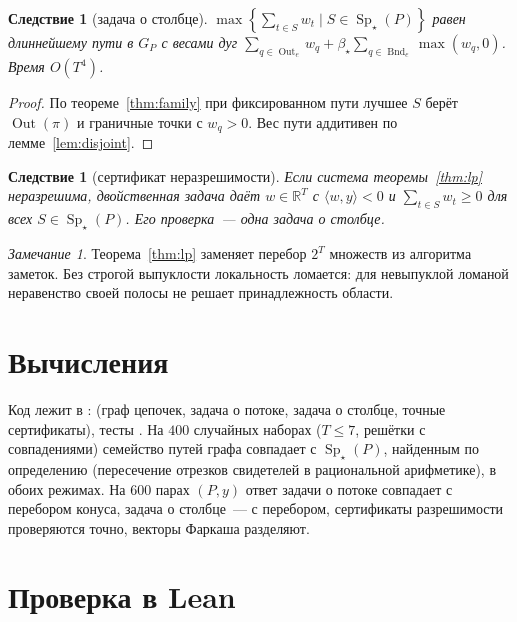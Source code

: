 \documentclass[a4paper,11pt]{article}
\theoremstyle{plain}
\newtheorem{corollary}[theorem]{Следствие}
\theoremstyle{definition}
\theoremstyle{remark}
\newtheorem*{remark}{Замечание}
\newcommand{\R}{\mathbb{R}}
\newcommand{\set}[1]{\left\{ #1 \right\}}
\newcommand{\ip}[2]{\langle #1, #2\rangle}
\DeclareMathOperator{\Sp}{Sp}
\DeclareMathOperator{\Out}{Out}
\DeclareMathOperator{\Bnd}{Bnd}
\newcommand{\Spm}{\Sp_\star}
\begin{document}
\begin{corollary}[задача о столбце]\label{cor:col}
    $\max\set{\sum_{t\in S}w_t\mid S\in\Spm(P)}$ равен длиннейшему пути в $G_P$ с весами дуг $\sum_{q\in\Out_e}w_q+\beta_\star\sum_{q\in\Bnd_e}\max(w_q,0)$. Время $O(T^4)$.
\end{corollary}

\begin{proof}
    По теореме~\ref{thm:family} при фиксированном пути лучшее $S$ берёт $\Out(\pi)$ и граничные точки с $w_q>0$. Вес пути аддитивен по лемме~\ref{lem:disjoint}.
\end{proof}

\begin{corollary}[сертификат неразрешимости]\label{cor:farkas}
    Если система теоремы~\ref{thm:lp} неразрешима, двойственная задача даёт $w\in\R^T$ с $\ip{w}{y}<0$ и $\sum_{t\in S}w_t\ge0$ для всех $S\in\Spm(P)$. Его проверка~--- одна задача о столбце.
\end{corollary}

\begin{remark}
    Теорема~\ref{thm:lp} заменяет перебор $2^T$ множеств из алгоритма заметок. Без строгой выпуклости локальность ломается: для невыпуклой ломаной неравенство своей полосы не решает принадлежность области.
\end{remark}

\section{Вычисления}\label{sec:exp}

Код лежит в :  (граф цепочек, задача о потоке, задача о столбце, точные сертификаты), тесты . На $400$ случайных наборах ($T\le7$, решётки с совпадениями) семейство путей графа совпадает с $\Spm(P)$, найденным по определению (пересечение отрезков свидетелей в рациональной арифметике), в обоих режимах. На $600$ парах $(P,y)$ ответ задачи о потоке совпадает с перебором конуса, задача о столбце~--- с перебором, сертификаты разрешимости проверяются точно, векторы Фаркаша разделяют.

\section{Проверка в Lean}
\end{document}
